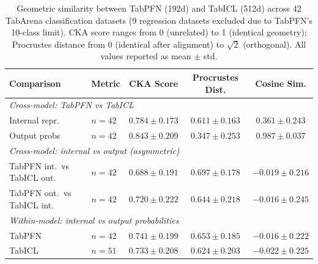\begin{table}[t]
\centering
\caption{Geometric similarity between TabPFN (192d) and TabICL (512d) across
42 TabArena classification datasets (9 regression datasets excluded due to
TabPFN's 10-class limit). CKA score ranges from 0 (unrelated) to 1 (identical
geometry); Procrustes distance from 0 (identical after alignment) to $\sqrt{2}$
(orthogonal). All values reported as mean $\pm$ std.}
\label{tab:tabarena_geometry}
\smallskip
\begin{tabular}{llccc}
\toprule
Comparison & Metric & CKA Score & Procrustes Dist. & Cosine Sim. \\
\midrule
\multicolumn{5}{l}{\textit{Cross-model: TabPFN vs TabICL}} \\
Internal repr. & $n=42$ & $0.784 \pm 0.173$ & $0.611 \pm 0.163$ & $0.361 \pm 0.243$ \\
Output probs & $n=42$ & $0.843 \pm 0.209$ & $0.347 \pm 0.253$ & $0.987 \pm 0.037$ \\
\midrule
\multicolumn{5}{l}{\textit{Cross-model: internal vs output (asymmetric)}} \\
TabPFN int.~vs TabICL out. & $n=42$ & $0.688 \pm 0.191$ & $0.697 \pm 0.178$ & $-0.019 \pm 0.216$ \\
TabPFN out.~vs TabICL int. & $n=42$ & $0.720 \pm 0.222$ & $0.644 \pm 0.218$ & $-0.016 \pm 0.245$ \\
\midrule
\multicolumn{5}{l}{\textit{Within-model: internal vs output probabilities}} \\
TabPFN & $n=42$ & $0.741 \pm 0.199$ & $0.653 \pm 0.185$ & $-0.016 \pm 0.222$ \\
TabICL & $n=51$ & $0.733 \pm 0.208$ & $0.624 \pm 0.203$ & $-0.022 \pm 0.225$ \\
\bottomrule
\end{tabular}
\end{table}
